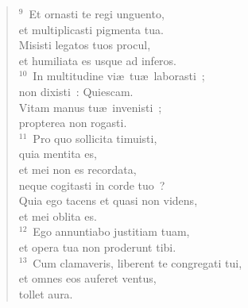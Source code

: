 \begin{verse}
${}^{9}$~Et ornasti te regi unguento,\\ et multiplicasti pigmenta tua.\\ Misisti legatos tuos procul,\\ et humiliata es usque ad inferos.\\
${}^{10}$~In multitudine vi\ae\ tu\ae\ laborasti~;\\ non dixisti~: Quiescam.\\ Vitam manus tu\ae\ invenisti~;\\ propterea non rogasti.\\
${}^{11}$~Pro quo sollicita timuisti,\\ quia mentita es,\\ et mei non es recordata,\\ neque cogitasti in corde tuo~?\\ Quia ego tacens et quasi non videns,\\ et mei oblita es.\\
${}^{12}$~Ego annuntiabo justitiam tuam,\\ et opera tua non proderunt tibi.\\
${}^{13}$~Cum clamaveris, liberent te congregati tui,\\ et omnes eos auferet ventus,\\ tollet aura.\end{verse}


